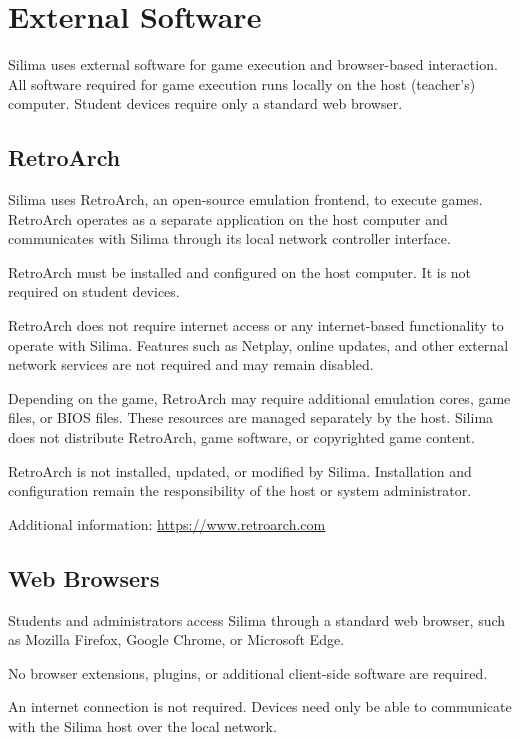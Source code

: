 \section{External Software}

Silima uses external software for game execution and browser-based
interaction. All software required for game execution runs locally
on the host (teacher's) computer. Student devices require only a
standard web browser.

\subsection{RetroArch}

Silima uses RetroArch, an open-source emulation frontend, to execute
games. RetroArch operates as a separate application on the host
computer and communicates with Silima through its local network
controller interface.

RetroArch must be installed and configured on the host computer.
It is not required on student devices.

RetroArch does not require internet access or any internet-based
functionality to operate with Silima. Features such as Netplay,
online updates, and other external network services are not
required and may remain disabled.

Depending on the game, RetroArch may require additional emulation
cores, game files, or BIOS files. These resources are managed
separately by the host. Silima does not distribute RetroArch,
game software, or copyrighted game content.

RetroArch is not installed, updated, or modified by Silima.
Installation and configuration remain the responsibility of
the host or system administrator.

Additional information:
\url{https://www.retroarch.com}

\subsection{Web Browsers}

Students and administrators access Silima through a standard
web browser, such as Mozilla Firefox, Google Chrome, or
Microsoft Edge.

No browser extensions, plugins, or additional client-side
software are required.

An internet connection is not required. Devices need only
be able to communicate with the Silima host over the local
network.


